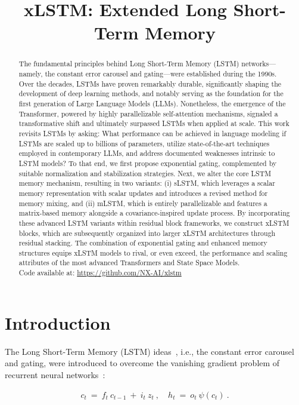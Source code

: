 \title{xLSTM: Extended Long Short-Term Memory}

\begin{abstract}
The fundamental principles behind Long Short-Term Memory (LSTM) networks—namely, the constant error carousel and gating—were established during the 1990s. Over the decades, LSTMs have proven remarkably durable, significantly shaping the development of deep learning methods, and notably serving as the foundation for the first generation of Large Language Models (LLMs). Nonetheless, the emergence of the Transformer, powered by highly parallelizable self-attention mechanisms, signaled a transformative shift and ultimately surpassed LSTMs when applied at scale. This work revisits LSTMs by asking: What performance can be achieved in language modeling if LSTMs are scaled up to billions of parameters, utilize state-of-the-art techniques employed in contemporary LLMs, and address documented weaknesses intrinsic to LSTM models? To that end, we first propose exponential gating, complemented by suitable normalization and stabilization strategies. Next, we alter the core LSTM memory mechanism, resulting in two variants: (i) sLSTM, which leverages a scalar memory representation with scalar updates and introduces a revised method for memory mixing, and (ii) mLSTM, which is entirely parallelizable and features a matrix-based memory alongside a covariance-inspired update process. By incorporating these advanced LSTM variants within residual block frameworks, we construct xLSTM blocks, which are subsequently organized into larger xLSTM architectures through residual stacking. The combination of exponential gating and enhanced memory structures equips xLSTM models to rival, or even exceed, the performance and scaling attributes of the most advanced Transformers and State Space Models.\\
Code available at: \url{https://github.com/NX-AI/xlstm}
\end{abstract}

\section{Introduction}
\label{sec:intro}

The Long Short-Term Memory (LSTM) ideas~\citep{Hochreiter:91,Hochreiter:97nips,Hochreiter:97}, i.e., the constant error carousel and gating, were introduced to overcome the vanishing gradient problem of recurrent neural networks~\citep{Hochreiter:91,Hochreiter:00book}:

\begin{align}
\label{eq:lstm_idea}
  c_t \ = \ f_t \ c_{t-1} \ + \ 
          i_t \  z_t \ , \quad  
          h_t \ = \ o_t \ \psi({c_t}) \ . 
\end{align}

